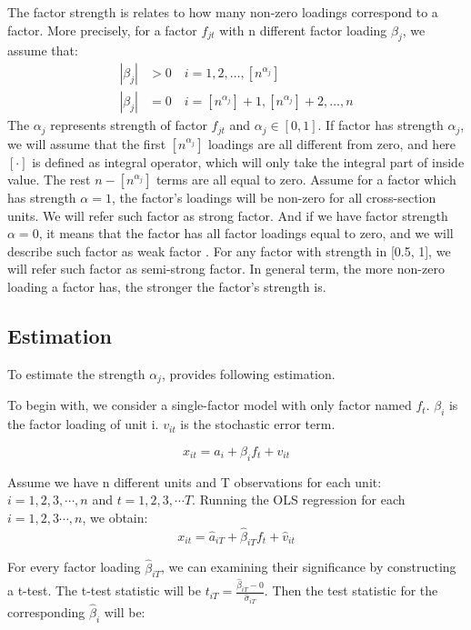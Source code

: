 The factor strength is relates to how many non-zero loadings correspond to a factor.
More precisely, for a factor $f_{jt}$ with n different factor loading $\beta_{j}$, we assume that:
\begin{align*}
|\beta_{j}| &> 0\quad i = 1, 2,  \dots, [n^{\alpha_j}]\\
|\beta_{j}| &= 0 \quad i = [n^{\alpha_j}] + 1, [n^{\alpha_j}] +2 ,\dots, n
\end{align*}
The $\alpha_j$ represents strength of factor $f_{jt}$ and $\alpha_j \in [0,1]$.
If factor has strength $\alpha_j$, we will assume that the first $[n^{\alpha_j}]$ loadings are all different from zero, and here $[\cdot] $  is defined as integral operator, which will only take the integral part of inside value.%
The rest $n - [n^{\alpha_j}]$ terms are all equal to zero. %
Assume for a factor which has strength $\alpha = 1$, the factor's loadings will be non-zero for all cross-section units.
We will refer such factor as strong factor.
And if we have factor strength $\alpha = 0$, it means that the factor has all factor loadings equal to zero, and we will describe such factor as weak factor \cite{Bailey2016}.
For any factor with strength in [0.5, 1], we will refer such factor as semi-strong factor.
In general term, the more non-zero loading a factor has, the stronger the factor's strength is. 

	\subsection{Estimation}\label{strength_one_factor_estimation}
To estimate the strength $\alpha_j$,  provides following estimation.

To begin with, we consider a single-factor model with only factor named $f_t$. 
 $\beta_{i}$ is the factor loading of unit i.
$v_{it}$ is the stochastic error term.

\[  x_{it} = a_{i} +  \beta_{i}f_{t} + v_{it} \tag{2} \label{estimation_model}\]

Assume we have n different units and T observations for each unit: $i = 1, 2, 3, \cdots, n$ and $t = 1,2,3, \cdots T$.
Running the OLS regression for each $i = 1,2,3\cdots, n$, we obtain:
\[   x_{it} = \hat{a}_{iT} +  \hat{\beta}_{iT}f_{t} + \hat{v}_{it}  \]

For every factor loading $\hat{\beta}_{iT}$, we can examining their significance by constructing a t-test.
The t-test statistic will be $t_{iT} = \frac{\hat{\beta}_{iT} - 0}{\hat{\sigma}_{iT}}$.  
Then the test statistic for the corresponding $\hat{\beta}_i$ will be:

